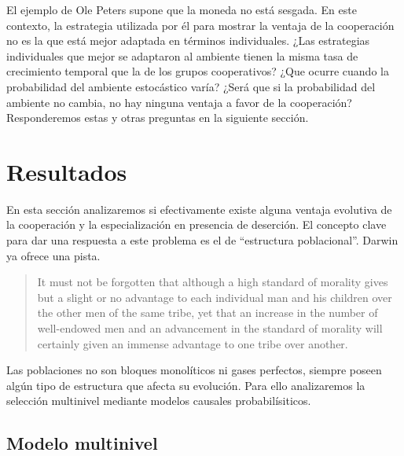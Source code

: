\documentclass[a4paper,10pt]{article}
\begin{document}

El ejemplo de Ole Peters supone que la moneda no está sesgada.
En este contexto, la estrategia utilizada por él para mostrar la ventaja de la cooperación no es la que está mejor adaptada en términos individuales.
¿Las estrategias individuales que mejor se adaptaron al ambiente tienen la misma tasa de crecimiento temporal que la de los grupos cooperativos?
¿Que ocurre cuando la probabilidad del ambiente estocástico varía? 
¿Será que si la probabilidad del ambiente no cambia, no hay ninguna ventaja a favor de la cooperación?
Responderemos estas y otras preguntas en la siguiente sección.

\section{Resultados}


En esta sección analizaremos si efectivamente existe alguna ventaja evolutiva de la cooperación y la especialización en presencia de deserción.
%
El concepto clave para dar una respuesta a este problema es el de ``estructura poblacional''.
%
Darwin ya ofrece una pista.
%
\begin{quotation}
It must not be forgotten that although a high standard of morality gives but a slight or no advantage to each individual man and his children over the other men of the same tribe, yet that an increase in the number of well-endowed men and an advancement in the standard of morality will certainly given an immense advantage to one tribe over another.
\end{quotation}
%
Las poblaciones no son bloques monolíticos ni gases perfectos, siempre poseen algún tipo de estructura que afecta su evolución.
%
Para ello analizaremos la selección multinivel mediante modelos causales probabilísiticos.

\subsection{Modelo multinivel}
\end{document}
